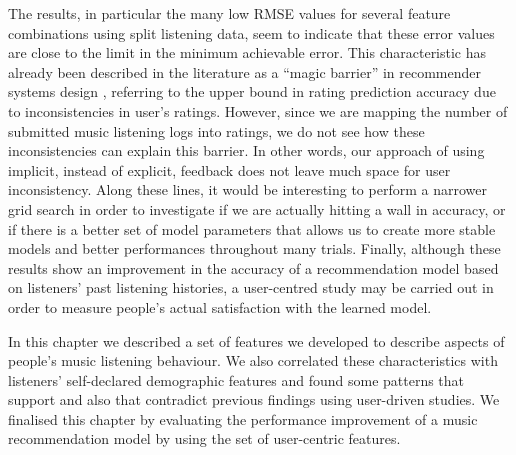 The results, in particular the many low RMSE values for several feature combinations using split listening data, seem to indicate that these error values are close to the limit in the minimum achievable error. This characteristic has already been described in the literature as a ``magic barrier'' in recommender systems design \autocite{herlocker04evaluating, bellogin14magic}, referring to the upper bound in rating prediction accuracy due to inconsistencies in user's ratings. However, since we are mapping the number of submitted music listening logs into ratings, we do not see how these inconsistencies can explain this barrier. In other words, our approach of using implicit, instead of explicit, feedback does not leave much space for user inconsistency.
Along these lines, it would be interesting to perform a narrower grid search in order to investigate if we are actually hitting a wall in accuracy, or if there is a better set of model parameters that allows us to create more stable models and  better performances throughout many trials.
Finally, although these results show an improvement in the accuracy of a recommendation model based on listeners' past listening histories, a user-centred study may be carried out in order to measure people's actual satisfaction with the learned model.

In this chapter we described a set of features we developed to describe aspects of people's music listening behaviour. We also correlated these characteristics with listeners' self-declared demographic features and found some patterns that support and also that contradict previous findings using user-driven studies.
We finalised this chapter by evaluating the performance improvement of a music recommendation model by using the set of user-centric features.




